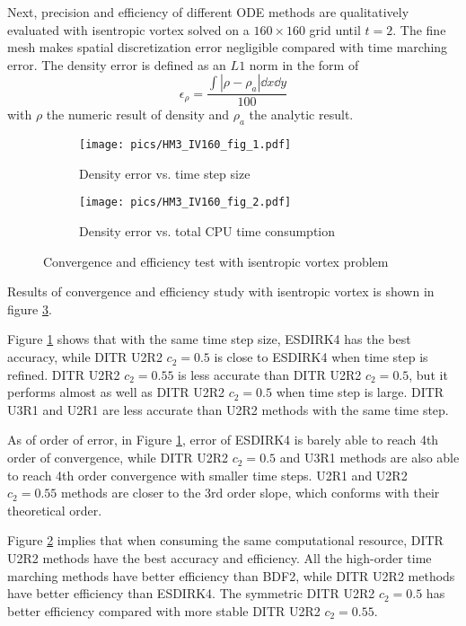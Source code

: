 \documentclass[preprint,12pt]{elsarticle}
\begin{document}
Next, precision and efficiency of different ODE methods are
qualitatively evaluated with isentropic vortex solved on a $160\times160$
grid until $t=2$.
The fine mesh makes spatial 
discretization error negligible compared with
time marching error.
The density error is defined as an $L1$ norm in the form of
\begin{equation}
    \epsilon_\rho = \frac{\int{|\rho-\rho_a| \dd x\dd y}}{
        100
    }
\end{equation}
with  $\rho$ the numeric result of density
and $\rho_a$ the analytic result.



\begin{figure}[htbp]
    \centering
    \begin{subfigure}{0.5\textwidth}
        \texttt{[image: pics/HM3\_IV160\_fig\_1.pdf]}
        \caption[]{Density error vs. time step size }
        \label{sfig:IVTests_Conv}
    \end{subfigure}\hfill
    \begin{subfigure}{0.5\textwidth}
        \texttt{[image: pics/HM3\_IV160\_fig\_2.pdf]}
        \caption[]{Density error vs. total CPU time consumption}
        \label{sfig:IVTests_Eff}
    \end{subfigure}
    \caption[]{Convergence and efficiency test with isentropic vortex problem}
    \label{fig:IVTests}
\end{figure}

Results of convergence and efficiency study with isentropic vortex is
shown in figure \ref{fig:IVTests}.

Figure \ref{sfig:IVTests_Conv} shows that with the same time step size,
ESDIRK4 has the best accuracy, while DITR U2R2 $c_2=0.5$ is close to
ESDIRK4 when time step is refined. DITR U2R2 $c_2=0.55$ is less accurate
than DITR U2R2 $c_2=0.5$, but it performs almost as well as
DITR U2R2 $c_2=0.5$ when time step is large.
DITR U3R1 and U2R1 are less accurate than U2R2 methods with
the same time step.

As of order of error, in Figure \ref{sfig:IVTests_Conv},
error of ESDIRK4 is barely able to reach 4th order of convergence,
while DITR U2R2 $c_2=0.5$ and U3R1 methods are also able to reach
4th order convergence with smaller time steps. U2R1 and U2R2 $c_2=0.55$
methods are closer to the 3rd order slope, which conforms with
their theoretical order.

Figure \ref{sfig:IVTests_Eff}
implies that when consuming the same computational resource,
DITR U2R2 methods have the best accuracy and efficiency.
All the high-order
time marching methods have better efficiency than BDF2,
while DITR U2R2 methods have better efficiency than ESDIRK4.
The symmetric DITR U2R2 $c_2=0.5$ has better efficiency
compared with more stable DITR U2R2 $c_2=0.55$.
\end{document}
